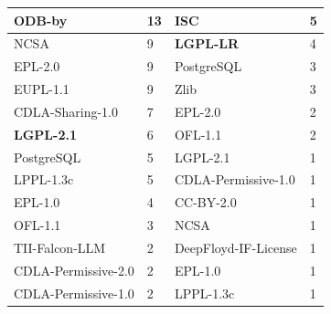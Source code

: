 \begin{table}[h]
\begin{tabular}{|ll||ll|}
  \multicolumn{1}{|l|}{ODB-by} & 13 & \multicolumn{1}{l|}{ISC} & 5 \\ \hline
  \multicolumn{1}{|l|}{NCSA} & 9 & \multicolumn{1}{l|}{\textbf{LGPL-LR}} & 4 \\ \hline
  \multicolumn{1}{|l|}{EPL-2.0} & 9 & \multicolumn{1}{l|}{PostgreSQL} & 3 \\ \hline
  \multicolumn{1}{|l|}{EUPL-1.1} & 9 & \multicolumn{1}{l|}{Zlib} & 3 \\ \hline
  \multicolumn{1}{|l|}{CDLA-Sharing-1.0} & 7 & \multicolumn{1}{l|}{EPL-2.0} & 2 \\ \hline
  \multicolumn{1}{|l|}{\textbf{LGPL-2.1}} & 6 & \multicolumn{1}{l|}{OFL-1.1} & 2 \\ \hline
  \multicolumn{1}{|l|}{PostgreSQL} & 5 & \multicolumn{1}{l|}{LGPL-2.1} & 1 \\ \hline
  \multicolumn{1}{|l|}{LPPL-1.3c} & 5 & \multicolumn{1}{l|}{CDLA-Permissive-1.0} & 1 \\ \hline
  \multicolumn{1}{|l|}{EPL-1.0} & 4 & \multicolumn{1}{l|}{CC-BY-2.0} & 1 \\ \hline
  \multicolumn{1}{|l|}{OFL-1.1} & 3 & \multicolumn{1}{l|}{NCSA} & 1 \\ \hline
  \multicolumn{1}{|l|}{TII-Falcon-LLM} & 2 & \multicolumn{1}{l|}{DeepFloyd-IF-License} & 1 \\ \hline
  \multicolumn{1}{|l|}{CDLA-Permissive-2.0} & 2 & \multicolumn{1}{l|}{EPL-1.0} & 1 \\ \hline
  \multicolumn{1}{|l|}{CDLA-Permissive-1.0} & 2 & \multicolumn{1}{l|}{LPPL-1.3c} & 1 \\ \hline
  \end{tabular}
\end{table}

\clearpage

